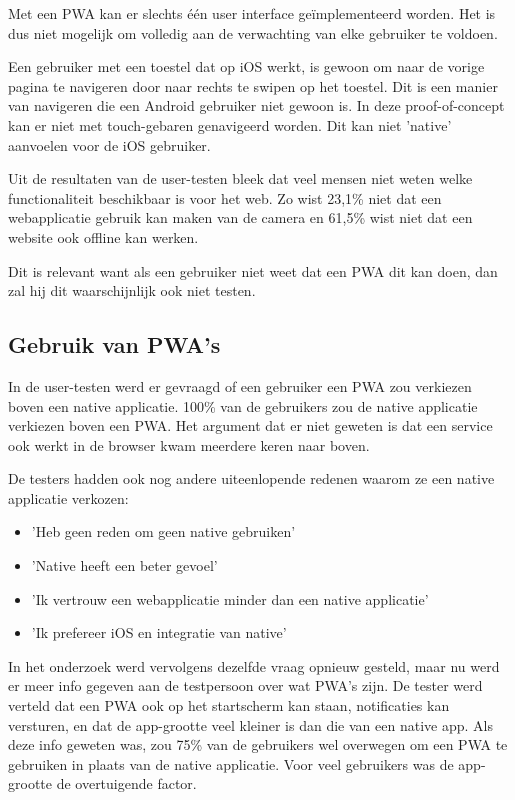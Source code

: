 		Met een PWA kan er slechts één user interface geïmplementeerd worden. Het is dus niet mogelijk om volledig aan de verwachting van elke gebruiker te voldoen.
		
		Een gebruiker met een toestel dat op iOS werkt, is gewoon om naar de vorige pagina te navigeren door naar rechts te swipen op het toestel. Dit is een manier van navigeren die een Android gebruiker niet gewoon is. In deze proof-of-concept kan er niet met touch-gebaren genavigeerd worden. Dit kan niet 'native' aanvoelen voor de iOS gebruiker. 
		
		Uit de resultaten van de user-testen bleek dat veel mensen niet weten welke functionaliteit beschikbaar is voor het web. Zo wist 23,1\% niet dat een webapplicatie gebruik kan maken van de camera en 61,5\% wist niet dat een website ook offline kan werken.
		
		Dit is relevant want als een gebruiker niet weet dat een PWA dit kan doen, dan zal hij dit waarschijnlijk ook niet testen. 
		
	\subsection{Gebruik van PWA's}
		In de user-testen werd er gevraagd of een gebruiker een PWA zou verkiezen boven een native applicatie. 
		100\% van de gebruikers zou de native applicatie verkiezen boven een PWA. Het argument dat er niet geweten is dat een service ook werkt in de browser kwam meerdere keren naar boven.
		
		De testers hadden ook nog andere uiteenlopende redenen waarom ze een native applicatie verkozen:
		\begin{itemize}
	  		\item 'Heb geen reden om geen native gebruiken'
	  		\item 'Native heeft een beter gevoel'
	  		\item 'Ik vertrouw een webapplicatie minder dan een native applicatie'
	  		\item 'Ik prefereer iOS en integratie van native'
	  	\end{itemize}	
			  	
		In het onderzoek werd vervolgens dezelfde vraag opnieuw gesteld, maar nu werd er meer info gegeven aan de testpersoon over wat PWA's zijn. De tester werd verteld dat een PWA ook op het startscherm kan staan, notificaties kan versturen, en dat de app-grootte veel kleiner is dan die van een native app. 
		Als deze info geweten was, zou 75\% van de gebruikers wel overwegen om een PWA te gebruiken in plaats van de native applicatie. Voor veel gebruikers was de app-grootte de overtuigende factor.
		
